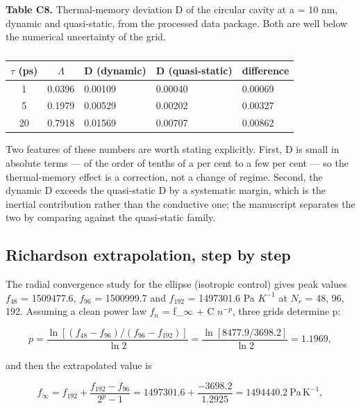 \documentclass[preprint,12pt]{elsarticle}
\begin{document}
\textbf{Table C8.} Thermal-memory deviation D of the circular cavity at a = 10 nm, dynamic and quasi-static, from the processed data package. Both are well below the numerical uncertainty of the grid.

\begin{table}[htbp]
\centering
\caption{}
\label{tab:?}
\begin{tabular}{cclll}
\toprule
$\tau$ (ps) & $\Lambda$ & D (dynamic) & D (quasi-static) & difference \\
\midrule
1 & 0.0396 & 0.00109 & 0.00040 & 0.00069 \\
5 & 0.1979 & 0.00529 & 0.00202 & 0.00327 \\
20 & 0.7918 & 0.01569 & 0.00707 & 0.00862 \\
\bottomrule
\end{tabular}
\end{table}

Two features of these numbers are worth stating explicitly. First, D is small in absolute terms --- of the order of tenths of a per cent to a few per cent --- so the thermal-memory effect is a correction, not a change of regime. Second, the dynamic D exceeds the quasi-static D by a systematic margin, which is the inertial contribution rather than the conductive one; the manuscript separates the two by comparing against the quasi-static family.

\subsection{Richardson extrapolation, step by step}
\label{sec:9.4}

The radial convergence study for the ellipse (isotropic control) gives peak values $f_{48}$ = 1509477.6, $f_{96}$ = 1500999.7 and $f_{192}$ = 1497301.6 Pa $K^{-1}$ at $N_{r}$ = 48, 96, 192. Assuming a clean power law $f_{n}$ = f\_$\infty$ + C $n^{- p}$, three grids determine p:

\begin{equation}
p=\frac{\ln\left[(f_{48}-f_{96})/(f_{96}-f_{192})\right]}{\ln 2}=\frac{\ln\left[8477.9/3698.2\right]}{\ln 2}=1.1969, 
\label{eq:28}
\end{equation}

and then the extrapolated value is

\begin{equation}
f_\infty=f_{192}+\frac{f_{192}-f_{96}}{2^{p}-1}=1497301.6+\frac{-3698.2}{1.2925}=1494440.2\ \mathrm{Pa\,K^{-1}}, 
\label{eq:29}
\end{equation}
\end{document}
